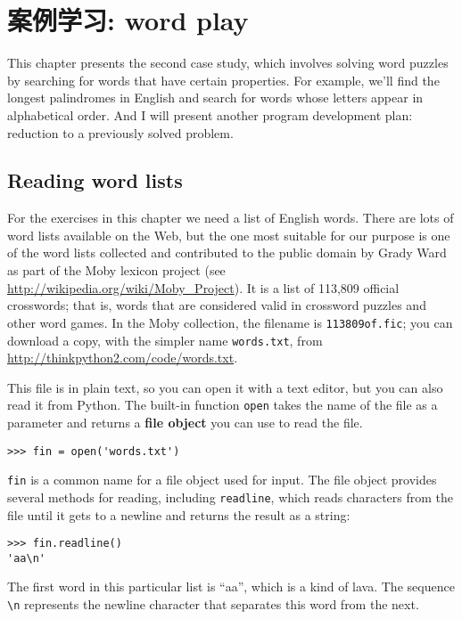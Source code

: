 \documentclass[10pt]{book}
\begin{document}
\chapter{案例学习: word play}
\label{wordplay}

This chapter presents the second case study, which involves
solving word puzzles by searching for words that have certain
properties.  For example, we'll find the longest palindromes
in English and search for words whose letters appear in
alphabetical order.  And I will present another program development
plan: reduction to a previously solved problem.


\section{Reading word lists}
\label{wordlist}

For the exercises in this chapter we need a list of English words.
There are lots of word lists available on the Web, but the one most
suitable for our purpose is one of the word lists collected and
contributed to the public domain by Grady Ward as part of the Moby
lexicon project (see \url{http://wikipedia.org/wiki/Moby_Project}).  It
is a list of 113,809 official crosswords; that is, words that are
considered valid in crossword puzzles and other word games.  In the
Moby collection, the filename is {\tt 113809of.fic}; you can download
a copy, with the simpler name {\tt words.txt}, from
\url{http://thinkpython2.com/code/words.txt}.

This file is in plain text, so you can open it with a text
editor, but you can also read it from Python.  The built-in
function {\tt open} takes the name of the file as a parameter
and returns a {\bf file object} you can use to read the file.

\begin{verbatim}
>>> fin = open('words.txt')
\end{verbatim}
%
{\tt fin} is a common name for a file object used for input.  The file
object provides several methods for reading, including {\tt readline},
which reads characters from the file until it gets to a newline and
returns the result as a string: 

\begin{verbatim}
>>> fin.readline()
'aa\n'
\end{verbatim}
%
The first word in this particular list is ``aa'', which is a kind of
lava.  The sequence \verb"\n" represents the newline character that 
separates this word from the next.
\end{document}
